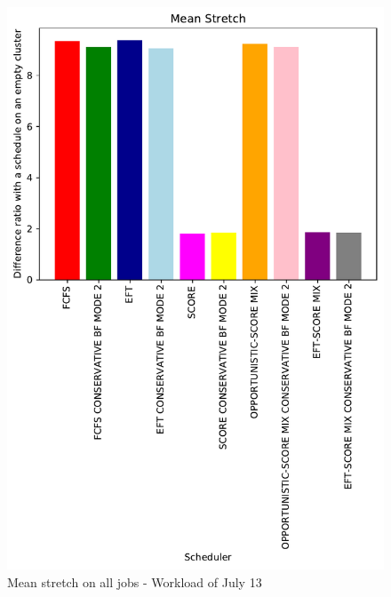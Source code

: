 \documentclass[conference,10pt]{IEEEtran}
\begin{document}
\begin{figure}\centering\includegraphics[width=1\linewidth]{../MBSS/plot/Results_FCFS_Score_Backfill_2022-07-13->2022-07-13_V10000_Mean_Stretch_450_128_32_256_4_1024.pdf}\caption{Mean stretch on all jobs - Workload of July 13}\end{figure}
\end{document}
